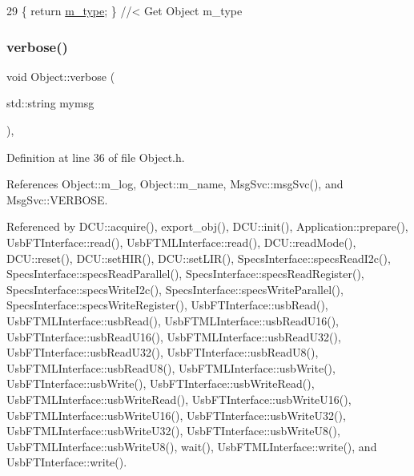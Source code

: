 \begin{DoxyCode}
29 \{ \textcolor{keywordflow}{return} \hyperlink{classObject_a457a600fe8c00eb1034374f75110a78c}{m\_type};       \} \textcolor{comment}{//< Get Object m\_type}
\end{DoxyCode}
\mbox{\label{classObject_a83d2db2df682907ea1115ad721c1c4a1}} 
\subsubsection{\texorpdfstring{verbose()}{verbose()}\hspace{0.1cm}{\footnotesize\ttfamily [1/2]}}
{\footnotesize\ttfamily void Object\+::verbose (\begin{DoxyParamCaption}\item[{std\+::string}]{mymsg }\end{DoxyParamCaption})\hspace{0.3cm}{\ttfamily [inline]}, {\ttfamily [inherited]}}



Definition at line 36 of file Object.\+h.



References Object\+::m\+\_\+log, Object\+::m\+\_\+name, Msg\+Svc\+::msg\+Svc(), and Msg\+Svc\+::\+V\+E\+R\+B\+O\+SE.



Referenced by D\+C\+U\+::acquire(), export\+\_\+obj(), D\+C\+U\+::init(), Application\+::prepare(), Usb\+F\+T\+Interface\+::read(), Usb\+F\+T\+M\+L\+Interface\+::read(), D\+C\+U\+::read\+Mode(), D\+C\+U\+::reset(), D\+C\+U\+::set\+H\+I\+R(), D\+C\+U\+::set\+L\+I\+R(), Specs\+Interface\+::specs\+Read\+I2c(), Specs\+Interface\+::specs\+Read\+Parallel(), Specs\+Interface\+::specs\+Read\+Register(), Specs\+Interface\+::specs\+Write\+I2c(), Specs\+Interface\+::specs\+Write\+Parallel(), Specs\+Interface\+::specs\+Write\+Register(), Usb\+F\+T\+Interface\+::usb\+Read(), Usb\+F\+T\+M\+L\+Interface\+::usb\+Read(), Usb\+F\+T\+M\+L\+Interface\+::usb\+Read\+U16(), Usb\+F\+T\+Interface\+::usb\+Read\+U16(), Usb\+F\+T\+M\+L\+Interface\+::usb\+Read\+U32(), Usb\+F\+T\+Interface\+::usb\+Read\+U32(), Usb\+F\+T\+Interface\+::usb\+Read\+U8(), Usb\+F\+T\+M\+L\+Interface\+::usb\+Read\+U8(), Usb\+F\+T\+M\+L\+Interface\+::usb\+Write(), Usb\+F\+T\+Interface\+::usb\+Write(), Usb\+F\+T\+Interface\+::usb\+Write\+Read(), Usb\+F\+T\+M\+L\+Interface\+::usb\+Write\+Read(), Usb\+F\+T\+Interface\+::usb\+Write\+U16(), Usb\+F\+T\+M\+L\+Interface\+::usb\+Write\+U16(), Usb\+F\+T\+Interface\+::usb\+Write\+U32(), Usb\+F\+T\+M\+L\+Interface\+::usb\+Write\+U32(), Usb\+F\+T\+Interface\+::usb\+Write\+U8(), Usb\+F\+T\+M\+L\+Interface\+::usb\+Write\+U8(), wait(), Usb\+F\+T\+M\+L\+Interface\+::write(), and Usb\+F\+T\+Interface\+::write().


